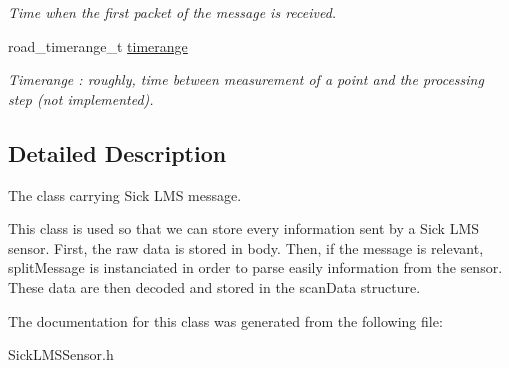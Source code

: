 \begin{DoxyCompactItemize}
\begin{DoxyCompactList}\small\item\em Time when the first packet of the message is received. \end{DoxyCompactList}\item 
\hypertarget{classpacpus_1_1MessageLMS_ab2158c796fc5510232ed9a222264f899}{road\-\_\-timerange\-\_\-t \hyperlink{classpacpus_1_1MessageLMS_ab2158c796fc5510232ed9a222264f899}{timerange}}\label{classpacpus_1_1MessageLMS_ab2158c796fc5510232ed9a222264f899}

\begin{DoxyCompactList}\small\item\em Timerange \-: roughly, time between measurement of a point and the processing step (not implemented). \end{DoxyCompactList}\end{DoxyCompactItemize}


\subsection{Detailed Description}
The class carrying Sick L\-M\-S message. 

This class is used so that we can store every information sent by a Sick L\-M\-S sensor. First, the raw data is stored in {\ttfamily body}. Then, if the message is relevant, {\ttfamily split\-Message} is instanciated in order to parse easily information from the sensor. These data are then decoded and stored in the scan\-Data structure. 

The documentation for this class was generated from the following file\-:\begin{DoxyCompactItemize}
\item 
Sick\-L\-M\-S\-Sensor.\-h\end{DoxyCompactItemize}
